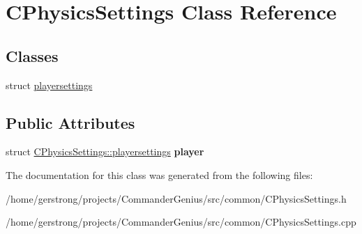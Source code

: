 \hypertarget{class_c_physics_settings}{
\section{CPhysicsSettings Class Reference}
\label{class_c_physics_settings}
}
\subsection*{Classes}
\begin{DoxyCompactItemize}
\item 
struct \hyperlink{struct_c_physics_settings_1_1playersettings}{playersettings}
\end{DoxyCompactItemize}
\subsection*{Public Attributes}
\begin{DoxyCompactItemize}
\item 
\hypertarget{class_c_physics_settings_a8c8e6c31b3bee26ec88acdae978f9574}{
struct \hyperlink{struct_c_physics_settings_1_1playersettings}{CPhysicsSettings::playersettings} {\bfseries player}}
\label{class_c_physics_settings_a8c8e6c31b3bee26ec88acdae978f9574}

\end{DoxyCompactItemize}


The documentation for this class was generated from the following files:\begin{DoxyCompactItemize}
\item 
/home/gerstrong/projects/CommanderGenius/src/common/CPhysicsSettings.h\item 
/home/gerstrong/projects/CommanderGenius/src/common/CPhysicsSettings.cpp\end{DoxyCompactItemize}
